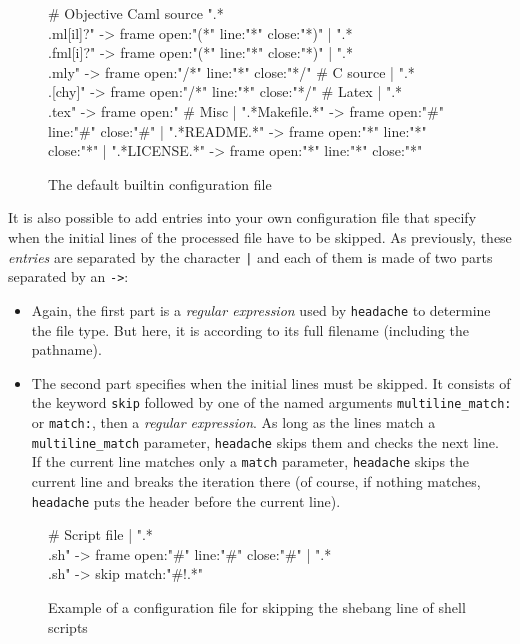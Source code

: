 \documentclass{article}
\newcommand{\mytt}[1]{\texttt{#1}}
\newcommand{\headache}{\mytt{headache}}
\begin{document}
\begin{figure}
\begin{center}
\begin{boxedverbatim}

# Objective Caml source
  ".*\\.ml[il]?" -> frame open:"(*" line:"*" close:"*)"
| ".*\\.fml[i]?" -> frame open:"(*" line:"*" close:"*)"
| ".*\\.mly"     -> frame open:"/*" line:"*" close:"*/"
# C source
| ".*\\.[chy]"    -> frame open:"/*" line:"*" close:"*/"
# Latex
| ".*\\.tex"     -> frame open:"%
# Misc
| ".*Makefile.*" -> frame open:"#"  line:"#" close:"#"
| ".*README.*"   -> frame open:"*"  line:"*" close:"*"
| ".*LICENSE.*"  -> frame open:"*"  line:"*" close:"*"
\end{boxedverbatim}
\end{center}
  \caption{The default builtin configuration file}
  \label{figure:config}
\end{figure}

It is also possible to add entries into your own configuration file that
specify when the initial lines of the processed file have to be skipped.
As previously, these \emph{entries} are separated by the character \mytt{|}
and each of them is made of two parts separated by an \mytt{->}:
\begin{itemize}
\item Again, the first part is a \emph{regular expression} used by \headache{}
  to determine the file type. But here, it is according to
  its full filename (including the pathname).
\item The second part specifies when the initial lines must be skipped.
  It consists of the keyword \mytt{skip} followed by one of the named
  arguments \mytt{multiline\_match:} or \mytt{match:}, then a \emph{regular expression}.
  As long as the lines match a \mytt{multiline\_match} parameter,
  \headache{} skips them and checks the next line.
  If the current line matches only a \mytt{match} parameter,
  \headache{} skips the current line and breaks the iteration there (of course,
  if nothing matches, \headache{} puts the header before the current line).

\end{itemize}

\begin{figure}
\begin{center}
\begin{boxedverbatim}
# Script file
 | ".*\\.sh" -> frame open:"#"  line:"#" close:"#"
 | ".*\\.sh" -> skip match:"#!.*"
\end{boxedverbatim}
\end{center}
  \caption{Example of a configuration file for skipping the shebang line of shell scripts}
  \label{figure:example}
\end{figure}
\end{document}
